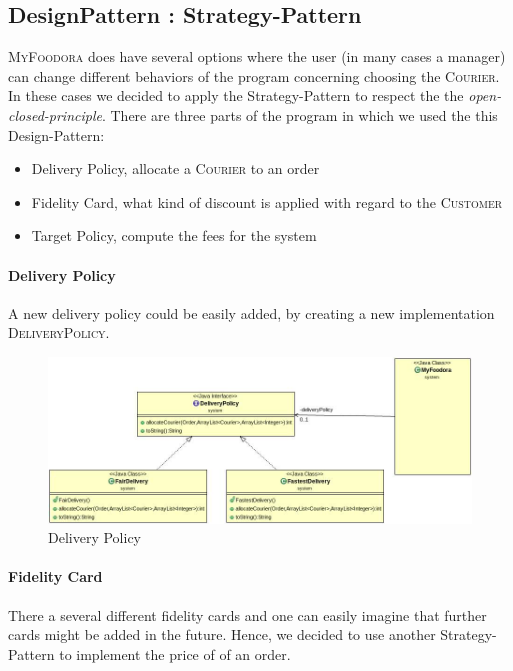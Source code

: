 \subsection{DesignPattern : Strategy-Pattern}
\label{sub:designpattern_strategy_pattern}

\textsc{MyFoodora} does have several options where the user (in many cases a manager) can change
different behaviors of the program concerning choosing the \textsc{Courier}. In these
cases we decided to apply the Strategy-Pattern to respect the the \textit{open-closed-principle}.
There are three parts of the program in which we used the this Design-Pattern:
\begin{itemize}
	\item Delivery Policy, allocate a \textsc{Courier} to an order
	\item Fidelity Card, what kind of discount is applied with regard to the
		\textsc{Customer}
	\item Target Policy, compute the fees for the system 
\end{itemize}

\paragraph{Delivery Policy}
\label{par:delivery_policy}
A new delivery policy could be easily added, by creating a new implementation
\textsc{DeliveryPolicy}.

\begin{figure}[H]
	\centering
	\includegraphics[width=1\linewidth]{./ima/deliverypolicy.jpg}
	\caption{Delivery Policy}
	\label{fig:deliveryPolicy}
\end{figure}

\paragraph{Fidelity Card}
\label{par:fideltycard}

There a several different fidelity cards and one can easily imagine that further cards might be 
added in the future. Hence, we decided to use another Strategy-Pattern to implement the price of
of an order. 

